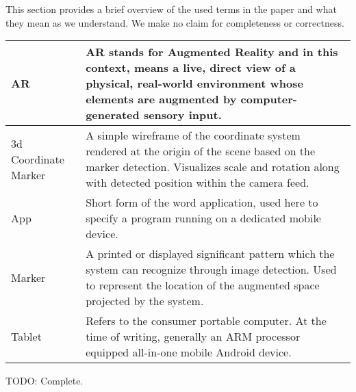 This section provides a brief overview of the used terms in the paper and what they mean as we understand.
We make no claim for completeness or correctness.

\begin{tabulary}{\textwidth}{L|L}
AR & AR stands for Augmented Reality and in this context, means a live, direct view of a physical, real-world environment whose elements are augmented by computer-generated sensory input\protect \cite{ardef}. \\
\hline
3d Coordinate Marker & A simple wireframe of the coordinate system rendered at the origin of the scene based on the marker detection. Visualizes scale and rotation along with detected position within the camera feed. \\
\hline
App & Short form of the word application, used here to specify a program running on a dedicated mobile device. \\
\hline
Marker & A printed or displayed significant pattern which the system can recognize through image detection. Used to represent the location of the augmented space projected by the system. \\
\hline
Tablet & Refers to the consumer portable computer. At the time of writing, generally an ARM processor equipped all-in-one mobile Android device.\\
\end{tabulary}

TODO: Complete.